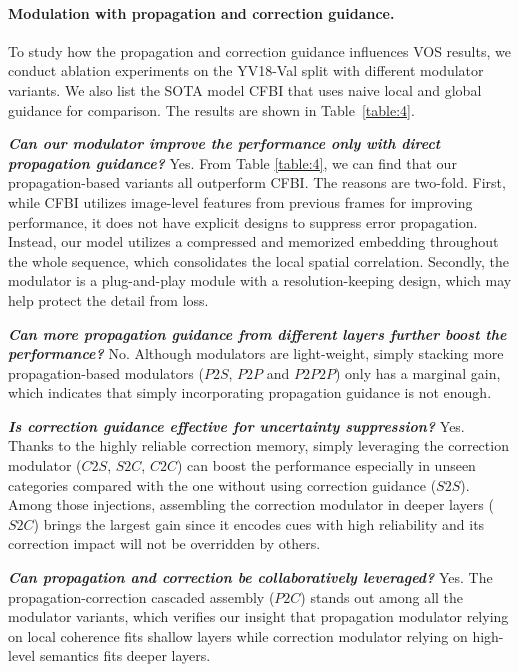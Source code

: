 \documentclass[letterpaper]{article} \usepackage{aaai22}  \usepackage{times}  \usepackage{helvet}  \usepackage{courier}  \usepackage[hyphens]{url}  \usepackage{graphicx} \urlstyle{rm} \def\UrlFont{\rm}  \usepackage{natbib}  \usepackage{caption} \DeclareCaptionStyle{ruled}{labelfont=normalfont,labelsep=colon,strut=off} \frenchspacing  \setlength{\pdfpagewidth}{8.5in}  \setlength{\pdfpageheight}{11in}  \usepackage{algorithm}
\newcommand{\tab}[1]{Table~#1}
\begin{document}
\paragraph{Modulation with propagation and correction guidance.}
To study how the propagation and correction guidance influences VOS results, we conduct ablation experiments on the YV18-Val split with different modulator variants.
We also list the SOTA model CFBI that uses naive local and global guidance for comparison.
The results are shown in \tab{\ref{table:4}}.

\textbf{\textit{Can our modulator improve the performance only with direct propagation guidance?}} Yes. From Table \ref{table:4}, we can find that our propagation-based variants all outperform CFBI. The reasons are two-fold. First, while CFBI utilizes image-level features from previous frames for improving performance, it does not have explicit designs to suppress error propagation. Instead, our model utilizes a compressed and memorized embedding throughout the whole sequence, which consolidates the local spatial correlation. Secondly, the modulator is a plug-and-play module with a resolution-keeping design, which may help protect the detail from loss.

\textbf{\textit{Can more propagation guidance from different layers further boost the performance?}} No. Although modulators are light-weight, simply stacking more propagation-based modulators ($P2S$, $P2P$ and $P2P2P$) only has a marginal gain, which indicates that simply incorporating propagation guidance is not enough.

\textbf{\textit{Is correction guidance effective for uncertainty suppression?}} Yes. Thanks to the highly reliable correction memory, simply leveraging the correction modulator ($C2S$, $S2C$, $C2C$) can boost the performance especially in unseen categories compared with the one without using correction guidance ($S2S$). 
Among those injections, assembling the correction modulator in deeper layers ($S2C$) brings the largest gain since it encodes cues with high reliability and its correction impact will not be overridden by others.

\textbf{\textit{Can propagation and correction be collaboratively leveraged?}} Yes. The propagation-correction cascaded assembly ($P2C$) stands out among all the modulator variants, which verifies our insight that propagation modulator relying on local coherence fits shallow layers while correction modulator relying on high-level semantics fits deeper layers. 
\end{document}
